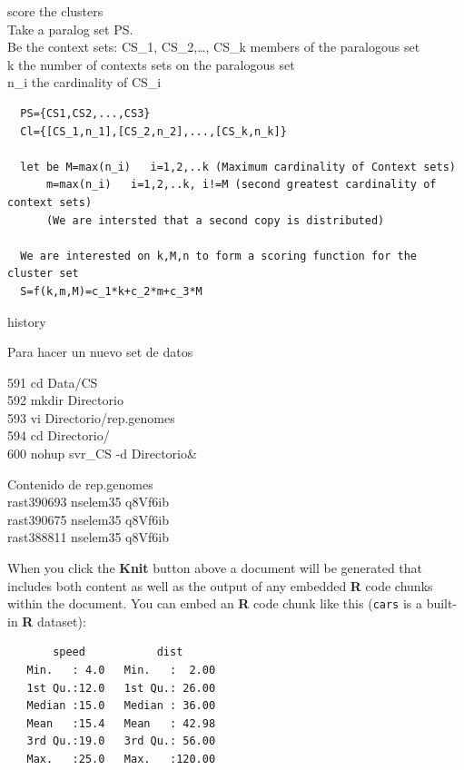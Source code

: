 \documentclass[12pt,twoside]{reedthesis}
\begin{document}
  score the clusters\\
   Take a paralog set PS.\\
   Be the context sets: CS\_1, CS\_2,\ldots{}, CS\_k members of the
  paralogous set\\
   k the number of contexts sets on the paralogous set\\
   n\_i the cardinality of CS\_i
  
  \begin{verbatim}
  PS={CS1,CS2,...,CS3}  
  Cl={[CS_1,n_1],[CS_2,n_2],...,[CS_k,n_k]}  
  
  let be M=max(n_i)   i=1,2,..k (Maximum cardinality of Context sets)  
      m=max(n_i)   i=1,2,..k, i!=M (second greatest cardinality of context sets)  
      (We are intersted that a second copy is distributed)  
  
  We are interested on k,M,n to form a scoring function for the cluster set  
  S=f(k,m,M)=c_1*k+c_2*m+c_3*M  
  \end{verbatim}
  
  history
  
  Para hacer un nuevo set de datos
  
  591 cd Data/CS\\
   592 mkdir Directorio\\
   593 vi Directorio/rep.genomes\\
   594 cd Directorio/\\
   600 nohup svr\_CS -d Directorio\&
  
  Contenido de rep.genomes\\
  rast\textbar{}390693 nselem35 q8Vf6ib\\
  rast\textbar{}390675 nselem35 q8Vf6ib\\
  rast\textbar{}388811 nselem35 q8Vf6ib
  
  When you click the \textbf{Knit} button above a document will be
  generated that includes both content as well as the output of any
  embedded \textbf{R} code chunks within the document. You can embed an
  \textbf{R} code chunk like this (\texttt{cars} is a built-in \textbf{R}
  dataset):
  
  \begin{Shaded}
  \begin{Highlighting}[]
  \end{Highlighting}
  \end{Shaded}
  
  \begin{verbatim}
       speed           dist       
   Min.   : 4.0   Min.   :  2.00  
   1st Qu.:12.0   1st Qu.: 26.00  
   Median :15.0   Median : 36.00  
   Mean   :15.4   Mean   : 42.98  
   3rd Qu.:19.0   3rd Qu.: 56.00  
   Max.   :25.0   Max.   :120.00  
  \end{verbatim}
  
\end{document}

